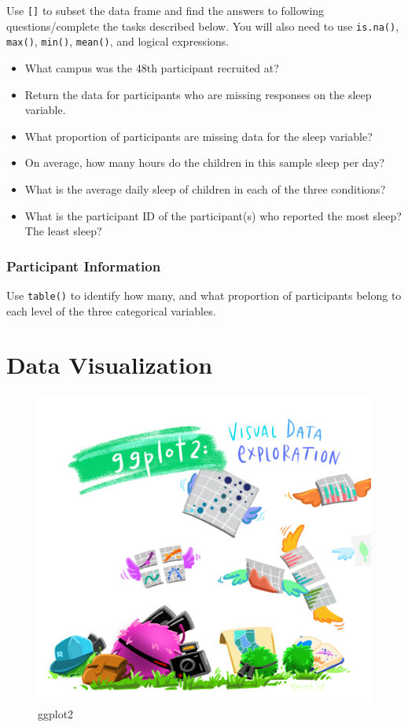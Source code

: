 \documentclass[
]{book}
\providecommand{\tightlist}{%
  \setlength{\itemsep}{0pt}\setlength{\parskip}{0pt}}
\begin{document}
Use \texttt{{[}{]}} to subset the data frame and find the answers to following questions/complete the tasks described below. You will also need to use \texttt{is.na()}, \texttt{max()}, \texttt{min()}, \texttt{mean()}, and logical expressions.

\begin{itemize}
\tightlist
\item
  What campus was the 48th participant recruited at?
\item
  Return the data for participants who are missing responses on the sleep variable.
\item
  What proportion of participants are missing data for the sleep variable?
\item
  On average, how many hours do the children in this sample sleep per day?
\item
  What is the average daily sleep of children in each of the three conditions?
\item
  What is the participant ID of the participant(s) who reported the most sleep? The least sleep?
\end{itemize}

\hypertarget{participant-information}{%
\subsection{Participant Information}\label{participant-information}}

Use \texttt{table()} to identify how many, and what proportion of participants belong to each level of the three categorical variables.

\hypertarget{data-viz}{%
\chapter{Data Visualization}\label{data-viz}}

\begin{figure}
\centering
\includegraphics{assets/images/ggplot2_exploratory.png}
\caption{ggplot2}
\end{figure}
\end{document}
